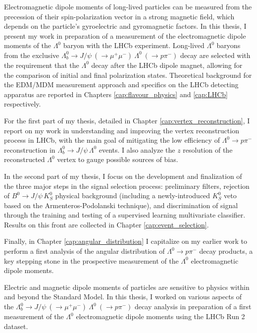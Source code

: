 \documentclass[12pt,a4paper]{book}
\newcommand{\demonstratorfull}{$\Lambda_b^0 \rightarrow J/\psi~(\rightarrow \mu^+ \mu^-)~\Lambda^0~(\rightarrow p\pi^-)$\xspace}
\newcommand{\demonstratorshort}{$\Lambda_b^0 \rightarrow J/\psi\,\Lambda^0$\xspace}
\newcommand{\physbkgshort}{$B^0 \rightarrow J/\psi\,K^0_S$\xspace}
\newcommand{\lz}{$\Lambda^0$\xspace}
\newcommand{\kshort}{$K^0_S$\xspace}
\newcommand{\lambdadecay}{$\Lambda^0 \rightarrow p\pi^-$\xspace}
\begin{document}
Electromagnetic dipole moments of long-lived particles can be measured from the precession of their spin-polarization vector in a strong magnetic field, which depends on the particle's gyroelectric and gyromagnetic factors.
In this thesis, I present my work in preparation of a measurement of the electromagnetic dipole moments of the \lz baryon with the LHCb experiment.
Long-lived \lz baryons from the exclusive \demonstratorfull decay are selected with the requirement that the \lz decay after the LHCb dipole magnet, allowing for the comparison of initial and final polarization states.
Theoretical background for the EDM/MDM measurement approach and specifics on the LHCb detecting apparatus are reported in Chapters \ref{cap:flavour_physics} and \ref{cap:LHCb} respectively.


For the first part of my thesis, detailed in Chapter \ref{cap:vertex_reconstruction}, I report on my work in understanding and improving the vertex reconstruction process in LHCb, with the main goal of mitigating the low efficiency of \lambdadecay reconstruction in \demonstratorshort events.
I also analyze the $z$ resolution of the reconstructed \lz vertex to gauge possible sources of bias.

In the second part of my thesis, I focus on the development and finalization of the three major steps in the signal selection process: preliminary filters, rejection of \physbkgshort physical background (including a newly-introduced \kshort veto based on the Armenteros-Podolanski technique), and discrimination of signal through the training and testing of a supervised learning multivariate classifier.
Results on this front are collected in Chapter \ref{cap:event_selection}.

Finally, in Chapter \ref{cap:angular_distribution} I capitalize on my earlier work to perform a first analysis of the angular distribution of \lambdadecay decay products, a key stepping stone in the prospective measurement of the \lz electromagnetic dipole moments.

Electric and magnetic dipole moments of particles are sensitive to physics within and beyond the Standard Model.
In this thesis, I worked on various aspects of the \demonstratorfull decay analysis in preparation of a first measurement of the \lz electromagnetic dipole moments using the LHCb Run 2 dataset.
\end{document}
